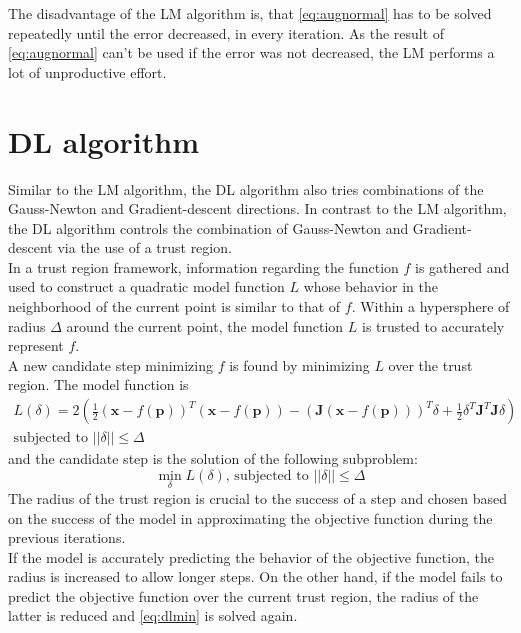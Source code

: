 The disadvantage of the \ac{LM} algorithm is, that \autoref{eq:augnormal} has to be solved repeatedly until the error decreased, in every iteration. As the result of \autoref{eq:augnormal} can't be used if the error was not decreased, the \ac{LM} performs a lot of unproductive effort.

\section{\acf{DL} algorithm}
Similar to the \ac{LM} algorithm, the \ac{DL} algorithm also tries combinations of the Gauss-Newton and Gradient-descent directions. In contrast to the \ac{LM} algorithm, the \ac{DL} algorithm controls the combination of Gauss-Newton and Gradient-descent via the use of a trust region.\\

In a trust region framework, information regarding the function $f$ is gathered and used to construct a quadratic model function $L$ whose behavior in the neighborhood of the current point is similar to that of $f$. Within a hypersphere of radius $\Delta$ around the current point, the model function $L$ is trusted to accurately represent $f$.\\

A new candidate step minimizing $f$ is found by minimizing $L$ over the trust region. The model function is
\begin{align}
  L(\delta) = 2(\frac{1}{2} (\mathbf{x} - f(\mathbf{p}))^T(\mathbf{x} - f(\mathbf{p})) - (\mathbf{J}(\mathbf{x} - f(\mathbf{p})))^T \delta + \frac{1}{2} \delta^T \mathbf{J}^T \mathbf{J} \delta)\\
  \text{subjected to } ||\delta|| \le \Delta \nonumber
\end{align}
and the candidate step is the solution of the following subproblem:
\begin{equation} 
  \min_\delta L(\delta) \text{, subjected to } ||\delta|| \le \Delta
  \label{eq:dlmin}
\end{equation}
The radius of the trust region is crucial to the success of a step and chosen based on the success of the model in approximating the objective function during the previous iterations.\\
If the model is accurately predicting the behavior of the objective function, the radius is increased to allow longer steps. On the other hand, if the model fails to predict the objective function over the current trust region, the radius of the latter is reduced and \autoref{eq:dlmin} is solved again.

